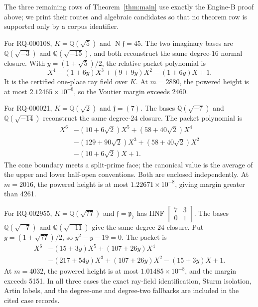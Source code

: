 \documentclass[11pt]{article}
\newcommand{\Q}{\mathbb Q}
\newcommand{\Norm}{\operatorname{N}}
\begin{document}
The three remaining rows of Theorem~\ref{thm:main} use exactly the
Engine-B proof above; we print their routes and algebraic candidates
so that no theorem row is supported only by a corpus identifier.

For RQ-000108, \(K=\Q(\sqrt5)\) and
\(\Norm\mathfrak f=45\).  The two imaginary bases are
\(\Q(\sqrt{-3})\) and \(\Q(\sqrt{-15})\), and both reconstruct the
same degree-$16$ normal closure.  With
\(y=(1+\sqrt5)/2\), the relative packet polynomial is
\begin{equation}\label{eq:packet-q5}
 X^4-(1+6y)X^3+(9+9y)X^2-(1+6y)X+1.
\end{equation}
It is the certified one-place ray field over \(K\).
At \(m=2880\), the powered height is at most
\(2.12465\times10^{-8}\), so the Voutier margin exceeds 2460.

For RQ-000021, \(K=\Q(\sqrt2)\) and
\(\mathfrak f=(7)\).  The bases \(\Q(\sqrt{-7})\) and
\(\Q(\sqrt{-14})\) reconstruct the same degree-$24$ closure.  The
packet polynomial is
\begin{equation}\label{eq:packet-q2}
\begin{aligned}
X^6&-(10+6\sqrt2)X^5+(58+40\sqrt2)X^4\\
&-(129+90\sqrt2)X^3+(58+40\sqrt2)X^2\\
&-(10+6\sqrt2)X+1.
\end{aligned}
\end{equation}
The cone boundary meets a split-prime face; the canonical value is
the average of the upper and lower half-open conventions.  Both are
enclosed independently.  At \(m=2016\), the powered height is at most
\(1.22671\times10^{-8}\), giving margin greater than 4261.

For RQ-002955, \(K=\Q(\sqrt{77})\) and
\(\mathfrak f=\mathfrak p_7\) has HNF
\(\left[\begin{smallmatrix}7&3\\0&1\end{smallmatrix}\right]\).
The bases \(\Q(\sqrt{-7})\) and \(\Q(\sqrt{-11})\) give the same
degree-$24$ closure.  Put \(y=(1+\sqrt{77})/2\), so
\(y^2-y-19=0\).  The packet is
\begin{equation}\label{eq:packet-q77}
\begin{aligned}
X^6&-(15+3y)X^5+(107+26y)X^4\\
&-(217+54y)X^3+(107+26y)X^2-(15+3y)X+1.
\end{aligned}
\end{equation}
At \(m=4032\), the powered height is at most
\(1.01485\times10^{-8}\), and the margin exceeds 5151.  In all three
cases the exact ray-field identification, Sturm isolation, Artin
labels, and the degree-one and degree-two fallbacks are included in
the cited case records.
\end{document}
